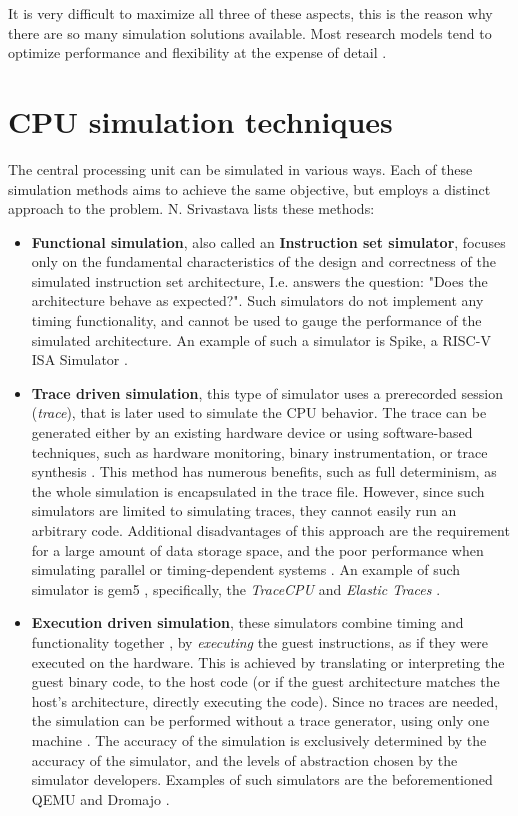 It is very difficult to maximize all three of these aspects, this is the reason why there are so many simulation
solutions available. Most research models tend to optimize performance and flexibility at the expense of detail
\cite{Simplescalar}.

\pagebreak
\section{CPU simulation techniques}

The central processing unit can be simulated in various ways. Each of these simulation methods aims to achieve the same
objective, but employs a distinct approach to the problem. N. Srivastava lists these \cite{Nitish-Techniques} methods:

\begin{itemize}
	\item{\textbf{Functional simulation}, also called an \textbf{Instruction set simulator}, focuses only on the
	fundamental characteristics of the design and correctness of the simulated instruction set architecture,
	I.e. answers the question: "Does the architecture behave as expected?". Such simulators do not implement any
	timing functionality, and cannot be used to gauge the performance of the simulated architecture. An example of such
	a simulator is Spike, a RISC-V ISA Simulator \cite{Spike}.}
	\item{\textbf{Trace driven simulation}, this type of simulator uses a prerecorded session (\textit{trace}), that is
	later used to simulate the CPU behavior. The trace can be generated either by an existing hardware device or
	using software-based techniques, such as hardware monitoring, binary instrumentation, or trace synthesis
	\cite{Simplescalar}. This method has numerous benefits, such as full determinism, as the whole simulation is
	encapsulated in the trace file. However, since such simulators are limited to simulating traces, they
	cannot easily run an arbitrary code. Additional disadvantages of this approach are the requirement for a large
	amount of data storage space, and the poor performance when simulating parallel or timing-dependent systems
	\cite{TraceDrivenAccuracy}. An example of such simulator is gem5 \cite{gem5}, specifically, the \textit{TraceCPU}
	and \textit{Elastic Traces} \cite{gem5trace}.}
	\item{\textbf{Execution driven simulation}, these simulators combine timing and functionality together
	\cite{Nitish-Techniques}, by \textit{executing} the guest instructions, as if they were executed on the hardware.
	This is achieved by translating or interpreting the guest binary code, to the host code (or if the guest
	architecture matches the host's architecture, directly executing the code). Since no traces are needed, the
	simulation can be performed without a trace generator, using only one machine \cite{TraceDrivenAccuracy}.
	The accuracy of the simulation is exclusively determined by the accuracy of the simulator, and the levels of
	abstraction chosen by the simulator developers. Examples of such simulators are the beforementioned QEMU and
	Dromajo \cite{Dromajo}.}
\end{itemize}

